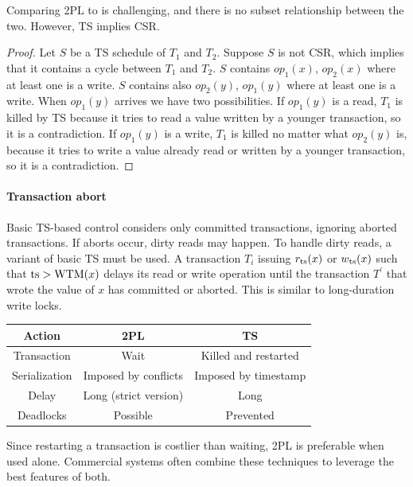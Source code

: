 Comparing 2PL to is challenging, and there is no subset relationship between the two. 
However, TS implies CSR.
\begin{proof}
    Let $S$ be a TS schedule of $T_1$ and $T_2$. Suppose $S$ is not CSR, which implies that it contains a cycle between $T_1$ and $T_2$. 
    $S$ contains $op_1(x)$, $op_2(x)$ where at least one is a write. 
    $S$ contains also $op_2(y)$, $op_1(y)$ where at least one is a write. 
    When $op_1(y)$ arrives we have two possibilities. 
    If $op_1(y)$ is a read, $T_1$ is killed by TS because it tries to read a value written by a younger transaction, so it is a contradiction. 
    If $op_1(y)$ is a write, $T_1$ is killed no matter what $op_2(y)$ is, because it tries to write a value already read or written by a younger transaction, so it is a contradiction. 
\end{proof}

\paragraph*{Transaction abort}
Basic TS-based control considers only committed transactions, ignoring aborted transactions. 
If aborts occur, dirty reads may happen. 
To handle dirty reads, a variant of basic TS must be used. 
A transaction $T_i$ issuing $r_{\textnormal{ts}}(x)$ or $w_{\textnormal{ts}}(x)$ such that $\textnormal{ts}>\textnormal{WTM}(x)$ delays its read or write operation until the transaction $T^{'}$ that wrote the value of $x$ has committed or aborted. 
This is similar to long-duration write locks.
\begin{table}[H]
    \centering
    \begin{tabular}{c|cc}
    \textbf{Action} & \textbf{2PL}          & \textbf{TS}          \\ \hline
    Transaction     & Wait                  & Killed and restarted \\
    Serialization   & Imposed by conflicts  & Imposed by timestamp \\
    Delay           & Long (strict version) & Long                 \\
    Deadlocks       & Possible              & Prevented           
    \end{tabular}
\end{table}
Since restarting a transaction is costlier than waiting, 2PL is preferable when used alone. 
Commercial systems often combine these techniques to leverage the best features of both. 

